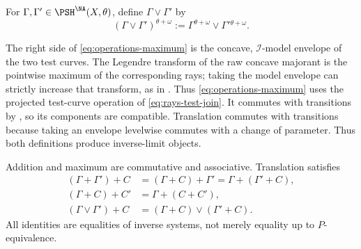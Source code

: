 \begin{definition}[Maximum]
\label{def:operations-maximum}
For $\Gamma,\Gamma'\in\PSH^{\NA}(X,\theta)$, define
$\Gamma\vee\Gamma'$ by
\[
 (\Gamma\vee\Gamma')^{\theta+\omega}
 :=\Gamma^{\theta+\omega}\vee
       \Gamma'{}^{\theta+\omega}.
\tag{54.5}\label{eq:operations-maximum}
\]
\end{definition}

The right side of \eqref{eq:operations-maximum} is the concave,
$\mathcal I$-model envelope of the two test curves.
The Legendre transform of the raw concave majorant is the pointwise
maximum of the corresponding rays; taking the model envelope can
strictly increase that transform, as in
.
Thus \eqref{eq:operations-maximum} uses the projected test-curve
operation of \eqref{eq:rays-test-join}.
It commutes with transitions by ,
so its components are compatible.  Translation commutes with transitions
because taking an envelope levelwise commutes with a change of parameter.
Thus both definitions produce inverse-limit objects.

\par\noindent\begin{minipage}{\textwidth}
\begin{proposition}\label{prop:operations-algebra}
Addition and maximum are commutative and associative.  Translation
satisfies
\[
 \begin{split}
 (\Gamma+\Gamma')+C
   &=(\Gamma+C)+\Gamma'=\Gamma+(\Gamma'+C),\\
 (\Gamma+C)+C'&=\Gamma+(C+C'),\\
 (\Gamma\vee\Gamma')+C
   &=(\Gamma+C)\vee(\Gamma'+C).
 \end{split}
\tag{54.6}\label{eq:operations-algebra}
\]
All identities are equalities of inverse systems, not merely equality
up to $P$-equivalence.
\end{proposition}
\end{minipage}\par\medskip

